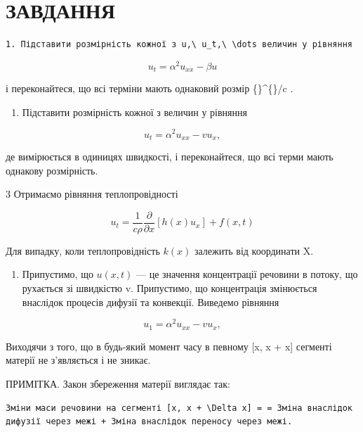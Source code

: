 \documentclass[
  ukrainian,
]{article}
\providecommand{\tightlist}{%
  \setlength{\itemsep}{0pt}\setlength{\parskip}{0pt}}
\begin{document}
\section{ЗАВДАННЯ}\label{ux437ux430ux432ux434ux430ux43dux43dux44f-2}

\begin{verbatim}
1. Підставити розмірність кожної з u,\ u_t,\ \dots величин у рівняння
\end{verbatim}

\[
u_t = \alpha^2 u_{xx} - \beta u
\]

і переконайтеся, що всі терміни мають однаковий розмір
\{\}\^{}\{\circ\}/c .

\begin{enumerate}
\def\labelenumi{\arabic{enumi}.}
\setcounter{enumi}{1}
\tightlist
\item
  Підставити розмірність кожної з величин у рівняння
\end{enumerate}

\[
u_t = \alpha^2 u_{xx} - v u_x,
\]

де \upsilon вимірюється в одиницях швидкості, і переконайтеся, що всі
терми мають однакову розмірність.

3 Отримаємо рівняння теплопровідності

\[
u_{t} = \frac{1}{c\rho} \frac{\partial}{\partial x} [h(x) u_{x}] + f(x, t)
\]

Для випадку, коли теплопровідність \(k\left( x\right)\) залежить від
координати X.

\begin{enumerate}
\def\labelenumi{\arabic{enumi}.}
\setcounter{enumi}{3}
\tightlist
\item
  Припустимо, що \(u(x, t)\) --- це значення концентрації речовини в
  потоку, що рухається зі швидкістю v. Припустимо, що концентрація
  змінюється внаслідок процесів дифузії та конвекції. Виведемо рівняння
\end{enumerate}

\[
u_1 = \alpha^2 u_{xx} - v u_x,
\]

Виходячи з того, що в будь-який момент часу в певному {[}x, x +
\Delta x{]} сегменті матерії не з'являється і не зникає.

ПРИМІТКА. Закон збереження матерії виглядає так:

\begin{verbatim}
Зміни маси речовини на сегменті [x, x + \Delta x] = = Зміна внаслідок дифузії через межі + Зміна внаслідок переносу через межі.
\end{verbatim}
\end{document}
